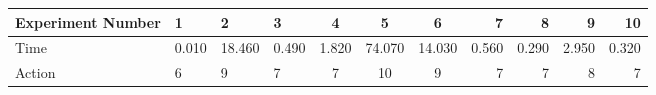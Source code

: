 \documentclass[8pt]{article}
\begin{document}
\begin{landscape}
\begin{tabular}{ | l | l | l | l | c | c | c | r | r | r | r | }
 \hline 
Experiment Number & 1 & 2 & 3 & 4 & 5 & 6 & 7 & 8 & 9 & 10\\ \hline
Time & 0.010 & 18.460 & 0.490 & 1.820 & 74.070 & 14.030 & 0.560 & 0.290 & 2.950 & 0.320\\ \hline
Action & 6 & 9 & 7 & 7 & 10 & 9 & 7 & 7 & 8 & 7\\ \hline\end{tabular}
\end{landscape}
\end{document}
